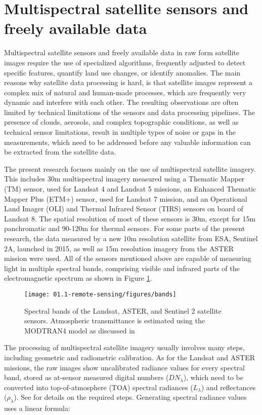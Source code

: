 \section{Multispectral satellite sensors and freely available data}

Multispectral satellite sensors and freely available data in raw form satellite images require the use of specialized algorithms, frequently adjusted to detect specific features, quantify land use changes, or identify anomalies. The main reasons why satellite data processing is hard, is that satellite images represent a complex mix of natural and human-made processes, which are frequently very dynamic and interfere with each other. The resulting observations are often limited by technical limitations of the sensors and data processing pipelines. The presence of clouds, aerosols, and complex topographic conditions, as well as technical sensor limitations, result in multiple types of noise or gaps in the measurements, which need to be addressed before any valuable information can be extracted from the satellite data.

The present research focuses mainly on the use of multispectral satellite imagery. This includes 30m multispectral imagery measured using a Thematic Mapper (TM) sensor, used for Landsat 4 and Landsat 5 missions, an Enhanced Thematic Mapper Plus (ETM+) sensor, used for Landsat 7 mission, and an Operational Land Imager (OLI) and Thermal Infrared Sensor (TIRS) sensors on board of Landsat 8. The spatial resolution of most of these sensors is 30m, except for 15m panchromatic and 90-120m for thermal sensors. For some parts of the present research, the data measured by a new 10m resolution satellite from ESA, Sentinel 2A, launched in 2015, as well as 15m resolution imagery from the ASTER mission were used. All of the sensors mentioned above are capable of measuring light in multiple spectral bands, comprising visible and infrared parts of the electromagnetic spectrum as shown in Figure \ref{fig:sensor-bands}.

\begin{figure}
	\texttt{[image: 01.1-remote-sensing/figures/bands]}
	\caption{Spectral bands of the Landsat, ASTER, and Sentinel 2 satellite sensors. Atmospheric transmittance is estimated using the MODTRAN4 model as discussed in \citet{verhoef2003simulation}}
	\label{fig:sensor-bands}
\end{figure}

The processing of multispectral satellite imagery usually involves many steps, including geometric and radiometric calibration. As for the Landsat and ASTER missions, the raw images show uncalibrated radiance values for every spectral band, stored as at-sensor measured digital numbers ($DN_\lambda$), which need to be converted into top-of-atmosphere (TOA) spectral radiances ($L_\lambda$) and reflectances ($\rho_\lambda$). See \citet{chander2009summary} for details on the required steps. Generating spectral radiance values uses a linear formula: 

